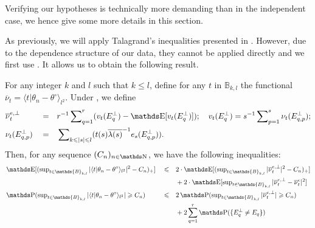 Verifying our hypotheses is technically more demanding than in the independent case, we hence give some more details in this section.

As previously, we will apply Talagrand's inequalities presented in .
However, due to the dependence structure of our data, they cannot be applied directly and we first use .
It allows us to obtain the following result.

\begin{lm}\label{LM_FREQ_CIRCDECONV_KNOWN_BETA_ORACLE_NP_SPLITBETA}
For any integer $k$ and $l$ such that $k \leq l$, define for any $t$ in $\mathds{B}_{k, l}$ the functional $\overline{\nu}_{t} =  \langle t \vert \theta_{n} - \theta^{\circ} \rangle_{l^{2}}$.
Under , we define
\begin{alignat*}{3}
& \overline{\nu}^{e, \perp}_{t} && = && r^{-1} \sum\nolimits_{q = 1}^{r}  (v_{t}(E^{\perp}_{q}) - \E [v_{t}(E^{\perp}_{q}) ] );\quad v_{t}(E^{\perp}_{q}) = s^{-1} \sum\nolimits_{p = 1}^{s} \nu_{t}(E^{\perp}_{q, p});\\
& \nu_{t}(E^{\perp}_{q, p}) && = && \sum\nolimits_{k \leq \vert s \vert \leq l}  (t(s)\overline{\lambda(s)}^{-1} e_{s}(E^{\perp}_{q, p}) ).
\end{alignat*}
Then, for any sequence $ (C_{n} )_{n \in \N}$, we have the following inequalities:
\begin{alignat}{3}
& \E  [  (\sup\nolimits_{t \in \mathds{B}_{k, l}}  \vert \langle t \vert \theta_{n} - \theta^{\circ} \rangle_{l^{2}}  \vert^{2} - C_{n}  )_{+}  ] && \leq && 2 \cdot \E [  (\sup\nolimits_{t \in \mathds{B}_{k, l}} \vert \overline{\nu}^{e, \perp}_{t} \vert^{2} - C_{n}  )_{+}  ] \notag\\
& && && + 2 \cdot \E [ \sup\nolimits_{t \in \mathds{B}_{k, l}} \vert \overline{\nu}^{e, \perp}_{t} - \overline{\nu}^{e}_{t} \vert^{2}  ]\label{EQ1_LM_FREQ_CIRCDECONV_KNOWN_BETA_ORACLE_NP_SPLITBETA}\\
&\P(\sup\nolimits_{t \in \mathds{B}_{k, l}} \vert \langle t \vert \theta_{n} - \theta^{\circ}\rangle_{l^{2}} \vert \geq C_{n}) && \leq && 2\P(\sup\nolimits_{t \in \mathds{B}_{k, l}} \vert \overline{\nu}_{t}^{e, \perp} \vert \geq C_{n})\notag\\
& && &&+2\sum_{q = 1}^{r}\P(\{E_{q}^{\perp} \neq E_{q}\})\label{EQ2_LM_FREQ_CIRCDECONV_KNOWN_BETA_ORACLE_NP_SPLITBETA}
\end{alignat}
\reEnd
\end{lm}

